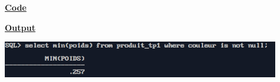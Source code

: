 \newpage
{}

\textbf{\underline{Code}}


\vspace{1cm}
\textbf{\underline{Output}}
\vspace{1cm}
\begin{center}
    \includegraphics[width=0.9\textwidth]{Questions/q29/q29.png}
\end{center}


